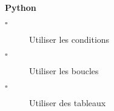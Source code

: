 \begin{titre}

\end{titre}


\begin{CpsCol}
\textbf{Python}
\begin{description}
\item[$\square$] Utiliser les conditions
\item[$\square$] Utiliser les boucles
\item[$\square$] Utiliser des tableaux
\end{description}
\end{CpsCol}


